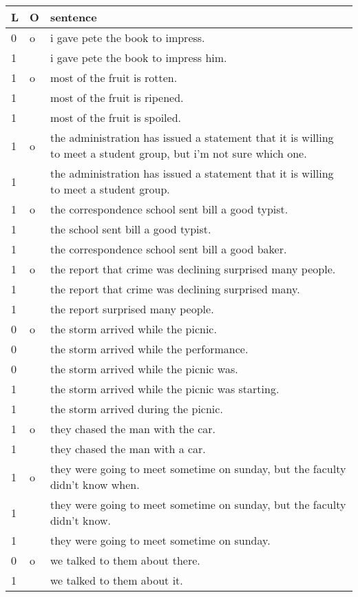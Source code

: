 \begin{center}
\begin{longtable}{p{0.5cm}p{0.5cm}p{15cm}}
\toprule
L & O & sentence \\
\toprule
0 & o & i gave pete the book to impress. \\
1 &   & i gave pete the book to impress him. \\
1 & o & most of the fruit is rotten. \\
1 &   & most of the fruit is ripened. \\
1 &   & most of the fruit is spoiled. \\
1 & o & the administration has issued a statement that it is willing to meet a student group, but i'm not sure which one. \\
1 &   & the administration has issued a statement that it is willing to meet a student group. \\
1 & o & the correspondence school sent bill a good typist. \\
1 &   & the school sent bill a good typist. \\
1 &   & the correspondence school sent bill a good baker. \\
1 & o & the report that crime was declining surprised many people. \\
1 &   & the report that crime was declining surprised many. \\
1 &   & the report surprised many people. \\
0 & o & the storm arrived while the picnic. \\
0 &   & the storm arrived while the performance. \\
0 &   & the storm arrived while the picnic was. \\
1 &   & the storm arrived while the picnic was starting. \\
1 &   & the storm arrived during the picnic. \\
1 & o & they chased the man with the car. \\
1 &   & they chased the man with a car. \\
1 & o & they were going to meet sometime on sunday, but the faculty didn't know when. \\
1 &   & they were going to meet sometime on sunday, but the faculty didn't know. \\
1 &   & they were going to meet sometime on sunday. \\
0 & o & we talked to them about there. \\
1 &   & we talked to them about it. \\

\end{longtable}
\end{center}
